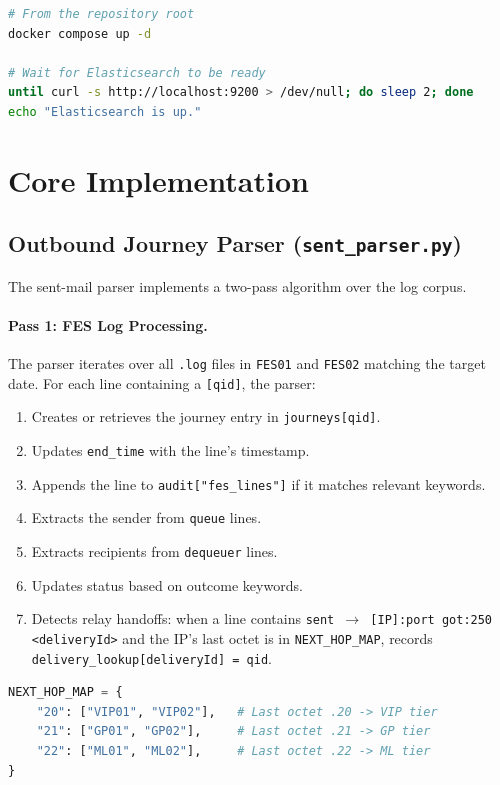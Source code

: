 \documentclass[12pt,a4paper,oneside]{report}
\begin{document}
\begin{lstlisting}[style=reportcode,language=bash,caption={Starting the full local stack},label={lst:compose}]
# From the repository root
docker compose up -d

# Wait for Elasticsearch to be ready
until curl -s http://localhost:9200 > /dev/null; do sleep 2; done
echo "Elasticsearch is up."
\end{lstlisting}

\section{Core Implementation}

\subsection{Outbound Journey Parser (\texttt{sent\_parser.py})}

The sent-mail parser implements a two-pass algorithm over the log corpus.

\paragraph{Pass 1: FES Log Processing.}
The parser iterates over all \texttt{.log} files in \texttt{FES01} and \texttt{FES02} matching the target date.
For each line containing a \texttt{[qid]}, the parser:
\begin{enumerate}
  \item Creates or retrieves the journey entry in \texttt{journeys[qid]}.
  \item Updates \texttt{end\_time} with the line's timestamp.
  \item Appends the line to \texttt{audit["fes\_lines"]} if it matches relevant keywords.
  \item Extracts the sender from \texttt{queue} lines.
  \item Extracts recipients from \texttt{dequeuer} lines.
  \item Updates status based on outcome keywords.
  \item Detects relay handoffs: when a line contains \texttt{sent $\rightarrow$ [IP]:port got:250 <deliveryId>} and the IP's last octet is in \texttt{NEXT\_HOP\_MAP}, records \texttt{delivery\_lookup[deliveryId] = qid}.
\end{enumerate}

\begin{lstlisting}[style=reportcode,language=Python,caption={\texttt{NEXT\_HOP\_MAP}: IP last-octet to server family mapping},label={lst:nexthop}]
NEXT_HOP_MAP = {
    "20": ["VIP01", "VIP02"],   # Last octet .20 -> VIP tier
    "21": ["GP01", "GP02"],     # Last octet .21 -> GP tier
    "22": ["ML01", "ML02"],     # Last octet .22 -> ML tier
}
\end{lstlisting}
\end{document}
